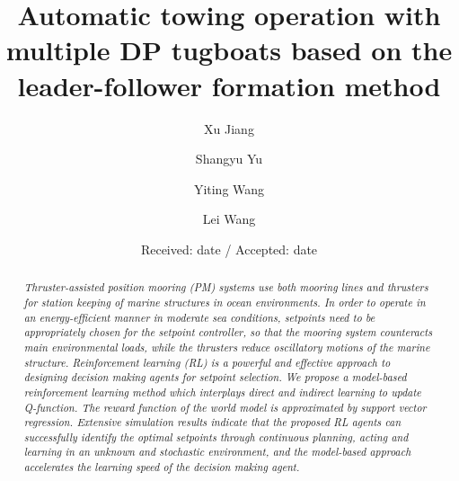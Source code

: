 \begin{sloppypar}
\title{Automatic towing operation with multiple DP tugboats based on the leader-follower formation method
}


\author{Xu Jiang \and
	Shangyu Yu     \and
	Yiting Wang     \and
	Lei Wang 
}



\date{Received: date / Accepted: date}


\maketitle
\begin{abstract}
{\it Thruster-assisted position mooring (PM) systems use both mooring lines and thrusters for station keeping of marine structures in ocean environments. In order to operate in an energy-efficient manner in moderate sea conditions, setpoints need to be appropriately chosen for the setpoint controller, so that the mooring system counteracts main environmental loads, while the thrusters reduce oscillatory motions of the marine structure. Reinforcement learning (RL) is a powerful and effective approach to designing decision making agents for setpoint selection. We propose a model-based reinforcement learning method which interplays direct and indirect learning to update Q-function. The reward function of the world model is approximated by support vector regression. Extensive simulation results indicate that the proposed RL agents can successfully identify the optimal setpoints through continuous planning, acting and learning in an unknown and stochastic environment, and the model-based approach accelerates the learning speed of the decision making agent.}
	

\end{abstract}
\end{sloppypar}
